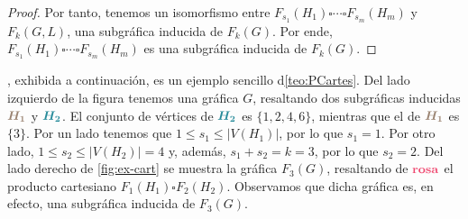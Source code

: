 \begin{proof}
    Por tanto, tenemos un isomorfismo entre $F_{s_1}(H_1) \square \cdots
    \square F_{s_m}(H_m)$ y $F_k(G,L)$, una subgr\'afica inducida de $F_k(G)$.
    Por ende, $F_{s_1}(H_1) \square \cdots \square F_{s_m}(H_m)$ es una
    subgr\'afica inducida de $F_k(G)$.
\end{proof}

, exhibida a continuaci\'on, es un ejemplo sencillo
d\cref{teo:PCartes}. Del lado izquierdo de la figura tenemos una gr\'afica $G$,
resaltando dos subgr\'aficas inducidas ${\color{baige}\boldsymbol {H_1}}$ y
${\color{azulMetal}\boldsymbol {H_2}}$. El conjunto de v\'ertices de
${\color{azulMetal}\boldsymbol {H_2}}$ es $\{1,2,4,6\}$, mientras que el de
${\color{baige}\boldsymbol {H_1}}$ es $\{3\}$. Por un lado tenemos que $1\leq
s_1 \leq |V(H_1)|$, por lo que $s_1 =1$. Por otro lado, $1\leq s_2 \leq |V(H_2)|
= 4$ y, adem\'as, $s_1+s_2 = k =3$, por lo que $s_2 =2$. Del lado derecho de
\cref{fig:ex-cart} se muestra la gr\'afica $F_3(G)$, resaltando de
$\color{fushia} \bf rosa$ el producto cartesiano $F_1(H_1) \square F_2(H_2)$.
Observamos que dicha gr\'afica es, en efecto, una subgr\'afica inducida de
$F_3(G)$.

